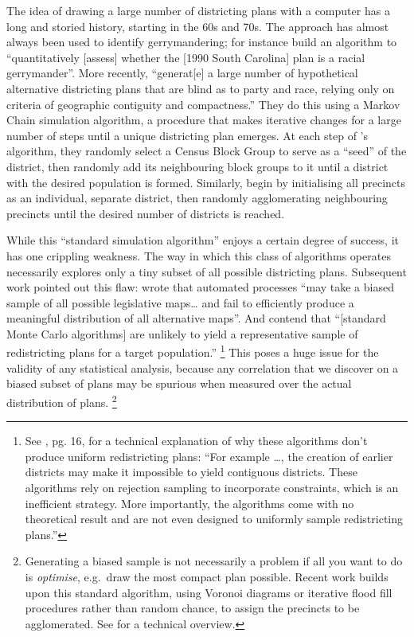 \documentclass[]{article}
\begin{document}
The idea of drawing a large number of districting plans with a computer
has a long and storied history, starting in the 60s and 70s. The
approach has almost always been used to identify gerrymandering; for
instance \cite{ccd2000} build an algorithm to ``quantitatively
{[}assess{]} whether the {[}1990 South Carolina{]} plan is a racial
gerrymander''. More recently, \cite{cr2013} ``generat{[}e{]} a large
number of hypothetical alternative districting plans that are blind as
to party and race, relying only on criteria of geographic contiguity and
compactness.'' They do this using a Markov Chain simulation algorithm, a
procedure that makes iterative changes for a large number of steps until
a unique districting plan emerges. At each step of
\citeauthor{ccd2000}'s algorithm, they randomly select a Census Block
Group to serve as a ``seed'' of the district, then randomly add its
neighbouring block groups to it until a district with the desired
population is formed. Similarly, \citeauthor{cr2013} begin by
initialising all precincts as an individual, separate district, then
randomly agglomerating neighbouring precincts until the desired number
of districts is reached.

While this ``standard simulation algorithm'' enjoys a certain degree of
success, it has one crippling weakness. The way in which this class of
algorithms operates necessarily explores only a tiny subset of all
possible districting plans. Subsequent work pointed out this flaw:
\citeauthor{mm2018} wrote that automated processes ``may take a biased
sample of all possible legislative maps\ldots{} and fail to efficiently
produce a meaningful distribution of all alternative maps''. And
\citeauthor{fifieldwp} contend that ``{[}standard Monte Carlo
algorithms{]} are unlikely to yield a representative sample of
redistricting plans for a target population.'' \footnote{See
  \cite{fifieldwp}, pg. 16, for a technical explanation of why these
  algorithms don't produce uniform redistricting plans: ``For example
  \ldots{}, the creation of earlier districts may make it impossible to
  yield contiguous districts. These algorithms rely on rejection
  sampling to incorporate constraints, which is an inefficient strategy.
  More importantly, the algorithms come with no theoretical result and
  are not even designed to uniformly sample redistricting plans.''} This
poses a huge issue for the validity of any statistical analysis, because
any correlation that we discover on a biased subset of plans may be
spurious when measured over the actual distribution of plans. \footnote{Generating
  a biased sample is not necessarily a problem if all you want to do is
  \emph{optimise}, e.g.~draw the most compact plan possible. Recent work
  builds upon this standard algorithm, using Voronoi diagrams or
  iterative flood fill procedures rather than random chance, to assign
  the precincts to be agglomerated. See \cite{lf2019} for a technical
  overview.}
\end{document}
